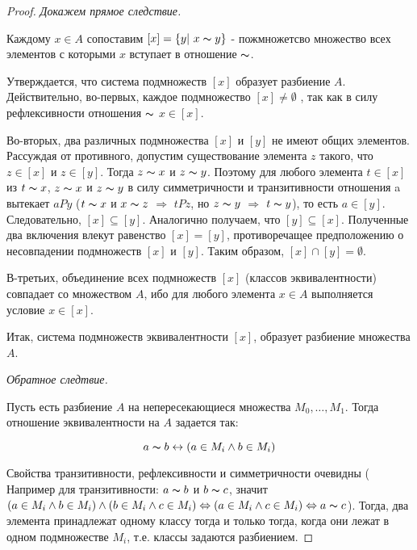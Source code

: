 \documentclass[a4paper,12pt]{article}
\begin{document}
        \begin{proof}
            \textit{Докажем прямое следствие.}

            Каждому $x \in A$ сопоставим $[x] = \{y|\ x\thicksim y\}$ - пожмножетсво множество всех элементов с которыми $x$ вступает в отношение $\thicksim $.

            Утверждается, что система подмножеств $[x]$ образует разбиение $A$. Действительно, во-первых, каждое подмножество $[x] \ne \emptyset$ , так как в силу рефлексивности отношения $\thicksim $  $x \in [x]$.   

            Во-вторых,  два различных подмножества $[x]$ и $[y]$ не имеют общих элементов. Рассуждая от противного, допустим существование элемента $z$ такого, что $z \in [x]$ и $z \in [y]$. Тогда $z\thicksim x$ и $z\thicksim y$. Поэтому для любого элемента $t \in [x]$ из $t\thicksim x$, $z\thicksim x$ и $z\thicksim y$ в силу симметричности и транзитивности отношения a вытекает $aPy$ ($t\thicksim x$ и $x\thicksim z$ $\Rightarrow$ $tPz$, но $z\thicksim y$ $\Rightarrow$ $t\thicksim y$), то есть $a \in [y]$. Следовательно, $[x] \subseteq [y]$. Аналогично получаем, что $[y] \subseteq [x]$. Полученные два включения влекут равенство $[x] = [y]$, противоречащее предположению о несовпадении подмножеств $[x]$ и $[y]$. Таким образом, $[x] \cap [y] = \emptyset$.

            В-третьих, объединение всех подмножеств $[x]$ (классов эквивалентности) совпадает со множеством $A$, ибо для любого элемента $x \in A$ выполняется условие $x \in [x]$.

            Итак, система подмножеств эквивалентности $[x]$, образует разбиение множества $A$.

            \textit{Обратное следтвие.}

            Пусть есть разбиение $A$ на непересекающиеся множества $M_0, \ldots, M_1$. Тогда отношение эквивалентности на $A$ задается так:

            $$a \thicksim b \leftrightarrow (a \in M_i \wedge b \in M_i)$$

             Свойства транзитивности, рефлексивности и симметричности очевидны ( Например для транзитивности: $a \thicksim b$ и $b \thicksim c$, значит $(a \in M_i \wedge b \in M_i) \wedge (b \in M_i \wedge c \in M_i) \Leftrightarrow (a \in M_i \wedge c \in M_i) \Leftrightarrow a \thicksim c$). Тогда, два элемента принадлежат одному классу тогда и только тогда, когда они лежат в одном подмножестве $M_i$, т.е. классы задаются разбиением.
        \end{proof}
\end{document}
